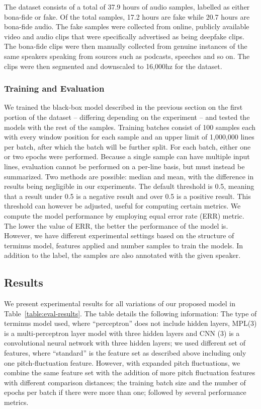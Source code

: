 \documentclass{article}
\begin{document}
The dataset consists of a total of 37.9 hours of audio samples, labelled as either bona-fide or fake. Of the total samples, 17.2 hours are fake while 20.7 hours are bona-fide audio. The fake samples were collected from online, publicly available video and audio clips that were specifically advertised as being deepfake clips. The bona-fide clips were then manually collected from genuine instances of the same speakers speaking from sources such as podcasts, speeches and so on. The clips were then segmented and downscaled to 16,000hz for the dataset.

\subsubsection{Training and Evaluation}
We trained the black-box model described in the previous section on the first portion of the dataset -- differing depending on the experiment -- and tested the models with the rest of the samples. Training batches consist of 100 samples each with every window position for each sample and an upper limit of 1,000,000 lines per batch, after which the batch will be further split. For each batch, either one or two epochs were performed. Because a single sample can have multiple input lines, evaluation cannot be performed on a per-line basis, but must instead be summarized. Two methods are possible: median and mean, with the difference in results being negligible in our experiments. The default threshold is 0.5, meaning that a result under 0.5 is a negative result and over 0.5 is a positive result. This threshold can however be adjusted, useful for computing certain metrics. We compute the model performance by employing equal error rate (ERR) metric. The lower the value of ERR, the better the performance of the model is. However, we have different experimental settings based on the structure of terminus model, features applied and number samples to train the models. In addition to the label, the samples are also annotated with the given speaker.

\subsection{Results}
We present experimental results for all variations of our proposed model in Table~\ref{table:eval-results}. The table details the following information: The type of terminus model used, where ``perceptron'' does not include hidden layers, MPL(3) is a multi-perceptron layer model with three hidden layers and CNN (3) is a convolutional neural network with three hidden layers; we used different set of features, where ``standard'' is the feature set as described above including only one pitch-fluctuation feature. However, with expanded pitch fluctuations, we combine the same feature set with the addition of more pitch fluctuation features with different comparison distances; the training batch size and the number of epochs per batch if there were more than one; followed by several performance metrics. 
\end{document}
